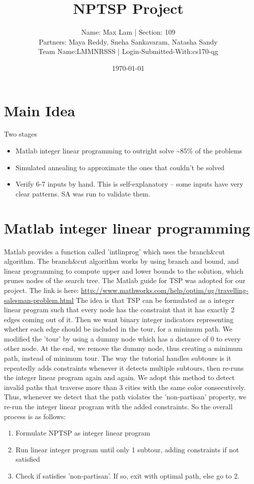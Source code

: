 \documentclass[11pt]{article}
\author{Name: Max Lam | Section: 109 \\ Partners: Maya Reddy, Sneha Sankavaram, Natasha Sandy \\ Team Name:LMMNRSSS | Login-Submitted-With:cs170-qg}
\date{\today}
\title{NPTSP Project}
\begin{document}
\maketitle
\tableofcontents

\newpage


\section{Main Idea}
\label{sec-1}
Two stages
\begin{itemize}
\item Matlab integer linear programming to outright solve \textasciitilde{}85\% of the problems
\item Simulated annealing to approximate the ones that couldn't be solved
\item Verify 6-7 inputs by hand. This is self-explanatory -- some inputs have very clear patterns. SA was run to validate them.
\end{itemize}

\section{Matlab integer linear programming}
\label{sec-2}
Matlab provides a function called 'intlinprog' which uses the branch\&cut algorithm.
The branch\&cut algorithm works by using branch and bound, and linear programming
to compute upper and lower bounds to the solution, which prunes nodes of the search tree.
The Matlab guide for TSP was adopted for our project.
The link is here: \url{http://www.mathworks.com/help/optim/ug/travelling-salesman-problem.html}
The idea is that TSP can be formulated as a integer linear program such that every node
has the constraint that it has exactly 2 edges coming out of it. Then we want binary integer
indicators representing whether each edge should be included in the tour, for a minimum path.
We modified the 'tour' by using a dummy node which has a distance of 0 to every other node.
At the end, we remove the dummy node, thus creating a minimum path, instead of minimum tour.
The way the tutorial handles subtours is it repeatedly adds constraints whenever it detects
multiple subtours, then re-runs the integer linear program again and again. We adopt this method
to detect invalid paths that traverse more than 3 cities with the same color consecutively.
Thus, whenever we detect that the path violates the 'non-partisan' property, we re-run the integer
linear program with the added constraints. So the overall process is as follows:\\
\begin{enumerate}
\item Formulate NPTSP as integer linear program
\item Run linear integer program until only 1 subtour, adding constraints if not satisfied
\item Check if satisfies 'non-partisan'. If so, exit with optimal path, else go to 2.
\end{enumerate}
\end{document}

